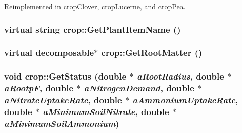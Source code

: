 Reimplemented in \hyperlink{classcrop_clover_a59fd79a6a70369bb7bae83417641ddef}{cropClover}, \hyperlink{classcrop_lucerne_a427ff2efe93600382bfac05ec8b48365}{cropLucerne}, and \hyperlink{classcrop_pea_ac337615ba724c897a369dd1ad85a951e}{cropPea}.\hypertarget{classcrop_ab34034b35e26b316a1649770f3de6374}{
\subsubsection[{GetPlantItemName}]{\setlength{\rightskip}{0pt plus 5cm}virtual string crop::GetPlantItemName ()}}
\label{classcrop_ab34034b35e26b316a1649770f3de6374}
\hypertarget{classcrop_ad8b5b9fcd4195ec6ce773c3b454e08b8}{
\subsubsection[{GetRootMatter}]{\setlength{\rightskip}{0pt plus 5cm}virtual {\bf decomposable}$\ast$ crop::GetRootMatter ()}}
\label{classcrop_ad8b5b9fcd4195ec6ce773c3b454e08b8}
\hypertarget{classcrop_a7f8e3691756173129745ea074a076442}{
\subsubsection[{GetStatus}]{\setlength{\rightskip}{0pt plus 5cm}void crop::GetStatus (double $\ast$ {\em aRootRadius}, \/  double $\ast$ {\em aRootpF}, \/  double $\ast$ {\em aNitrogenDemand}, \/  double $\ast$ {\em aNitrateUptakeRate}, \/  double $\ast$ {\em aAmmoniumUptakeRate}, \/  double $\ast$ {\em aMinimumSoilNitrate}, \/  double $\ast$ {\em aMinimumSoilAmmonium})}}
\label{classcrop_a7f8e3691756173129745ea074a076442}


